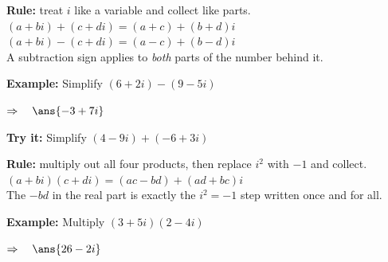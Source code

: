 \documentclass[12pt]{article}
\begin{document}


\begin{formulabox}
\textbf{Rule:} treat $i$ like a variable and collect like parts.\\[3pt]
$(a + bi) + (c + di) = (a + c) + (b + d)i$ \qquad
$(a + bi) - (c + di) = (a - c) + (b - d)i$\\[3pt]
A subtraction sign applies to \textit{both} parts of the number behind it.
\end{formulabox}

\begin{examplebox}
\textbf{Example:} \quad Simplify $(6 + 2i) - (9 - 5i)$

$\Rightarrow\quad \ans{-3 + 7i}$
\end{examplebox}

\begin{tryitbox}
\textbf{Try it:} \quad Simplify $(4 - 9i) + (-6 + 3i)$\\[2pt]
\end{tryitbox}


\begin{formulabox}
\textbf{Rule:} multiply out all four products, then replace $i^2$ with $-1$
and collect.\\[3pt]
$(a + bi)(c + di) = (ac - bd) + (ad + bc)i$\\[3pt]
The $-bd$ in the real part is exactly the $i^2 = -1$ step written once and for all.
\end{formulabox}

\begin{examplebox}
\textbf{Example:} \quad Multiply $(3 + 5i)(2 - 4i)$

$\Rightarrow\quad \ans{26 - 2i}$
\end{examplebox}
\end{document}
